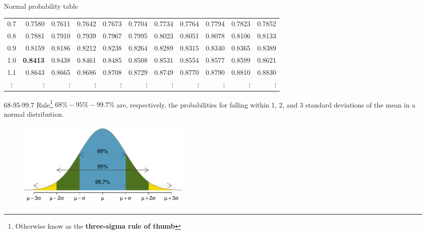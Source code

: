 \documentclass[12pt,a4paper]{beamer}
\begin{document}
\begin{frame}{Normal probability table}
\begin{table}
{\begin{tabular}{c | rrrrr | rrrrr |}
	  0.7 & \scriptsize{0.7580} & \scriptsize{0.7611} & \scriptsize{0.7642} & \scriptsize{0.7673} & \scriptsize{0.7704} & \scriptsize{0.7734} & \scriptsize{0.7764} & \scriptsize{0.7794} & \scriptsize{0.7823} & \scriptsize{0.7852} \\
	0.8 & \scriptsize{0.7881} & \scriptsize{0.7910} & \scriptsize{0.7939} & \scriptsize{0.7967} & \scriptsize{0.7995} & \scriptsize{0.8023} & \scriptsize{0.8051} & \scriptsize{0.8078} & \scriptsize{0.8106} & \scriptsize{0.8133} \\
	  0.9 & \scriptsize{0.8159} & \scriptsize{0.8186} & \scriptsize{0.8212} & \scriptsize{0.8238} & \scriptsize{0.8264} & \scriptsize{0.8289} & \scriptsize{0.8315} & \scriptsize{0.8340} & \scriptsize{0.8365} & \scriptsize{0.8389} \\
	  \hline
	  \hline
	  1.0 & \textbf{0.8413} & \scriptsize{0.8438} & \scriptsize{0.8461} & \scriptsize{0.8485} & \scriptsize{0.8508} & \scriptsize{0.8531} & \scriptsize{0.8554} & \scriptsize{0.8577} & \scriptsize{0.8599} & \scriptsize{0.8621} \\
	  1.1 & \scriptsize{0.8643} & \scriptsize{0.8665} & \scriptsize{0.8686} & \scriptsize{0.8708} & \scriptsize{0.8729} & \scriptsize{0.8749} & \scriptsize{0.8770} & \scriptsize{0.8790} & \scriptsize{0.8810} & \scriptsize{0.8830} \\
	  $\vdots$ &   $\vdots$ &   $\vdots$ &   $\vdots$ &   $\vdots$ &   $\vdots$ &   $\vdots$ &   $\vdots$ &   $\vdots$ &   $\vdots$ &   $\vdots$ \\
	   \hline
	\end{tabular}}
	\end{table}
\end{frame}
\begin{frame}{68-95-99.7 Rule\footnote{\small Otherwise know as the \textbf{three-sigma rule of thumb}}}
$68\%-95\%-99.7\%$ are, respectively, the probabilities for falling within 1, 2, and 3 standard deviations of the mean in a normal distribution.
	\begin{figure}[hht]
	\centering
	\includegraphics[height=1.7in]{figures/6895997/6895997}
	\end{figure}
\end{frame}
\end{document}
